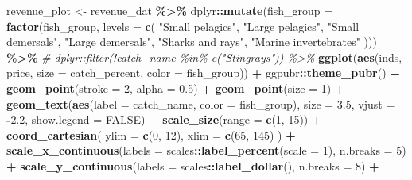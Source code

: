 \documentclass[
]{book}
\newenvironment{Shaded}{\begin{snugshade}}{\end{snugshade}}
\newcommand{\AttributeTok}[1]{\textcolor[rgb]{0.13,0.29,0.53}{#1}}
\newcommand{\CommentTok}[1]{\textcolor[rgb]{0.56,0.35,0.01}{\textit{#1}}}
\newcommand{\ConstantTok}[1]{\textcolor[rgb]{0.56,0.35,0.01}{#1}}
\newcommand{\DecValTok}[1]{\textcolor[rgb]{0.00,0.00,0.81}{#1}}
\newcommand{\FloatTok}[1]{\textcolor[rgb]{0.00,0.00,0.81}{#1}}
\newcommand{\FunctionTok}[1]{\textcolor[rgb]{0.13,0.29,0.53}{\textbf{#1}}}
\newcommand{\NormalTok}[1]{#1}
\newcommand{\OtherTok}[1]{\textcolor[rgb]{0.56,0.35,0.01}{#1}}
\newcommand{\SpecialCharTok}[1]{\textcolor[rgb]{0.81,0.36,0.00}{\textbf{#1}}}
\newcommand{\StringTok}[1]{\textcolor[rgb]{0.31,0.60,0.02}{#1}}
\begin{document}
\begin{Shaded}
\begin{Highlighting}[]
\NormalTok{revenue\_plot }\OtherTok{\textless{}{-}}
\NormalTok{  revenue\_dat }\SpecialCharTok{\%\textgreater{}\%}
\NormalTok{  dplyr}\SpecialCharTok{::}\FunctionTok{mutate}\NormalTok{(}\AttributeTok{fish\_group =} \FunctionTok{factor}\NormalTok{(fish\_group, }\AttributeTok{levels =} \FunctionTok{c}\NormalTok{(}
    \StringTok{"Small pelagics"}\NormalTok{, }\StringTok{"Large pelagics"}\NormalTok{, }\StringTok{"Small demersals"}\NormalTok{, }\StringTok{"Large demersals"}\NormalTok{,}
    \StringTok{"Sharks and rays"}\NormalTok{, }\StringTok{"Marine invertebrates"}
\NormalTok{  ))) }\SpecialCharTok{\%\textgreater{}\%}
  \CommentTok{\# dplyr::filter(!catch\_name \%in\% c("Stingrays")) \%\textgreater{}\%}
  \FunctionTok{ggplot}\NormalTok{(}\FunctionTok{aes}\NormalTok{(inds, price, }\AttributeTok{size =}\NormalTok{ catch\_percent, }\AttributeTok{color =}\NormalTok{ fish\_group)) }\SpecialCharTok{+}
\NormalTok{  ggpubr}\SpecialCharTok{::}\FunctionTok{theme\_pubr}\NormalTok{() }\SpecialCharTok{+}
  \FunctionTok{geom\_point}\NormalTok{(}\AttributeTok{stroke =} \DecValTok{2}\NormalTok{, }\AttributeTok{alpha =} \FloatTok{0.5}\NormalTok{) }\SpecialCharTok{+}
  \FunctionTok{geom\_point}\NormalTok{(}\AttributeTok{size =} \DecValTok{1}\NormalTok{) }\SpecialCharTok{+}
  \FunctionTok{geom\_text}\NormalTok{(}\FunctionTok{aes}\NormalTok{(}\AttributeTok{label =}\NormalTok{ catch\_name, }\AttributeTok{color =}\NormalTok{ fish\_group), }\AttributeTok{size =} \FloatTok{3.5}\NormalTok{, }\AttributeTok{vjust =} \SpecialCharTok{{-}}\FloatTok{2.2}\NormalTok{, }\AttributeTok{show.legend =} \ConstantTok{FALSE}\NormalTok{) }\SpecialCharTok{+}
  \FunctionTok{scale\_size}\NormalTok{(}\AttributeTok{range =} \FunctionTok{c}\NormalTok{(}\DecValTok{1}\NormalTok{, }\DecValTok{15}\NormalTok{)) }\SpecialCharTok{+}
  \FunctionTok{coord\_cartesian}\NormalTok{(}
    \AttributeTok{ylim =} \FunctionTok{c}\NormalTok{(}\DecValTok{0}\NormalTok{, }\DecValTok{12}\NormalTok{),}
    \AttributeTok{xlim =} \FunctionTok{c}\NormalTok{(}\DecValTok{65}\NormalTok{, }\DecValTok{145}\NormalTok{)}
\NormalTok{  ) }\SpecialCharTok{+}
  \FunctionTok{scale\_x\_continuous}\NormalTok{(}\AttributeTok{labels =}\NormalTok{ scales}\SpecialCharTok{::}\FunctionTok{label\_percent}\NormalTok{(}\AttributeTok{scale =} \DecValTok{1}\NormalTok{), }\AttributeTok{n.breaks =} \DecValTok{5}\NormalTok{) }\SpecialCharTok{+}
  \FunctionTok{scale\_y\_continuous}\NormalTok{(}\AttributeTok{labels =}\NormalTok{ scales}\SpecialCharTok{::}\FunctionTok{label\_dollar}\NormalTok{(), }\AttributeTok{n.breaks =} \DecValTok{8}\NormalTok{) }\SpecialCharTok{+}

\end{Highlighting}
\end{Shaded}
\end{document}
